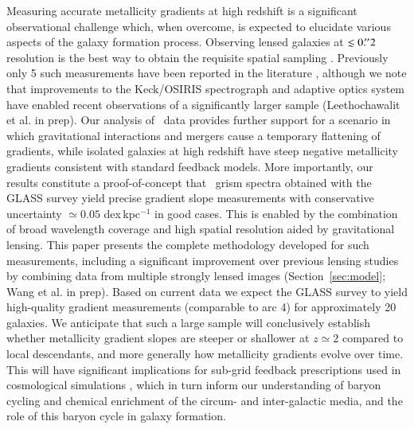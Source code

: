 Measuring accurate metallicity gradients at high redshift is a significant observational challenge which, when
overcome, is expected to elucidate various aspects of the galaxy formation process. Observing lensed galaxies at
$\lesssim0\mbox{$.\!^{\prime\prime}$}2$ resolution is the best way to obtain the requisite spatial sampling \citep{Yuan2013}.
Previously only 5 such measurements have been reported in the literature \citep{Jones2010,Jones2013,Yuan2011},
although we note that improvements to the Keck/OSIRIS spectrograph and adaptive optics system have enabled recent
observations of a significantly larger sample (Leethochawalit et al. in prep). Our analysis of \hst\ data
provides further support for a scenario in which gravitational interactions and mergers cause a temporary
flattening of gradients, while isolated galaxies at high redshift have steep negative metallicity gradients
consistent with standard feedback models. More importantly, our results constitute a proof-of-concept that \hst\
grism spectra obtained with the GLASS survey yield precise gradient slope measurements with conservative
uncertainty $\simeq0.05$ dex\,kpc$^{-1}$ in good cases. This is enabled by the combination of broad wavelength
coverage and high spatial resolution aided by gravitational lensing. This paper presents the complete methodology
developed for such measurements, including a significant improvement over previous lensing studies by combining
data from multiple strongly lensed images (Section~\ref{sec:model}; Wang et al. in prep). Based on current data
we expect the GLASS survey to yield high-quality gradient measurements (comparable to arc 4) for approximately 20
galaxies. We anticipate that such a large sample will conclusively establish whether metallicity gradient slopes
are steeper or shallower at $z\simeq2$ compared to local descendants, and more generally how metallicity
gradients evolve over time. This will have significant implications for sub-grid feedback prescriptions used in
cosmological simulations \citep[e.g.,][]{Gibson2013,Angles-Alcazar2014}, which in turn inform our understanding
of baryon cycling and chemical enrichment of the circum- and inter-galactic media, and the role of this baryon
cycle in galaxy formation.


